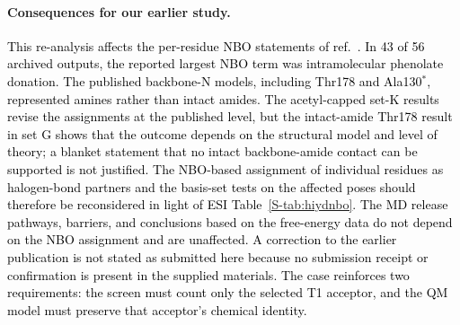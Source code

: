 \documentclass[journal=jcisd8,manuscript=article,layout=two-column]{achemso}
\newcommand{\tcb}[1]{{\textcolor{black}{#1}}}
\newcommand{\BX}{BondX Studio}
\begin{document}
\paragraph{Consequences for our earlier study.}
\tcb{This re-analysis affects the per-residue NBO statements of ref.~\citenum{Karmakar2026}. In 43 of 56 archived outputs, the reported largest NBO term was intramolecular phenolate donation. The published backbone-N models, including Thr178 and Ala130$^*$, represented amines rather than intact amides. The acetyl-capped set-K results revise the assignments at the published level, but the intact-amide Thr178 result in set G shows that the outcome depends on the structural model and level of theory; a blanket statement that no intact backbone-amide contact can be supported is not justified. The NBO-based assignment of individual residues as halogen-bond partners and the basis-set tests on the affected poses should therefore be reconsidered in light of ESI Table~\ref{S-tab:hiydnbo}. The MD release pathways, barriers, and conclusions based on the free-energy data do not depend on the NBO assignment and are unaffected. A correction to the earlier publication is not stated as submitted here because no submission receipt or confirmation is present in the supplied materials. The case reinforces two requirements: the screen must count only the selected T1 acceptor, and the QM model must preserve that acceptor's chemical identity.}
\end{document}
